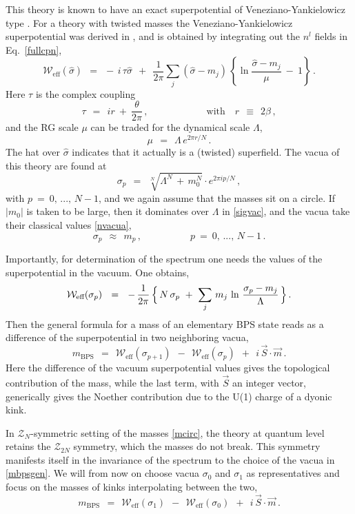 \documentclass[epsfig,12pt]{article}
\def\beq{\begin{equation}}
\def\eeq{\end{equation}}
\def\beq{\begin{equation}}
\def\eeq{\end{equation}}
\newcommand{\mc}[1]{\mathcal{#1}}
\newcommand{\mbps}{m_\text{BPS}}
\newcommand{\W}{\mathcal{W}}
\newcommand{\hsigma}{{\hat{\sigma}}}
\begin{document}
	This theory is known to have an exact superpotential of Veneziano-Yankielowicz type 
	\cite{VYan}.
	For a theory with twisted masses the Veneziano-Yankielowicz superpotential was 
	derived in \cite{AdDVecSal,ChVa,W93,HaHo,Dor}, 
	and is obtained by integrating out the $ n^l $ fields in Eq.~\eqref{fullcpn},
\beq
\label{Wfull}
	\W_\text{eff}(\hsigma) ~~=~~
		-\, i\, \tau \hsigma ~~+~~
		\frac{1}{2\pi} \sum_j (\hsigma - m_j)\, 
				      \left\{ \ln {\frac{\hsigma - m_j}{\mu}} ~-~ 1 \right\}\,.
\eeq
	Here $ \tau $ is the complex coupling
\beq
	\tau ~~=~~ i r ~+~ \frac{\theta}{2\pi}\,, \qquad\qquad\qquad   \text{with~~~} r ~~\equiv~~ 2\beta\,,
\eeq
	and the RG scale $ \mu $ can be traded for the dynamical scale $ \Lambda $,
\beq
	\mu ~~=~~ \Lambda\, e^{2\pi r/N}\,.
\eeq
	The hat over $ \hsigma $ indicates that it actually is a (twisted) superfield.
	The vacua of this theory are found at
\beq
\label{sigvac}
	\sigma_p ~~=~~ \sqrt[N] { \Lambda^N \,+\, m_0^N } \cdot e^{ 2\pi i p / N }\,, 
\eeq
	with $ p ~=~ 0,\,...,\, N-1 $, 
	and we again assume that the masses sit on a circle.
	If $ | m_ 0 | $ is taken to be large, then it dominates over $ \Lambda $ in \eqref{sigvac},
	and the vacua take their classical values \eqref{nvacua},
\beq
	\sigma_p ~~\approx~~ m_p\,, \qquad\qquad\quad p ~=~ 0,\,...,\,N-1\,.
\eeq

	Importantly, for determination of the spectrum one needs the values of the superpotential
	in the vacuum.
	One obtains,
\beq
\label{Wvac}
	\W_\text{eff} ( \sigma_p ) ~~=~~ 
		-\, \frac{1}{2\pi}\,  
                \Bigl\{\, N\, \sigma_p ~+~ \sum_j\, m_j\, \ln \,\frac{\sigma_p - m_j}{\Lambda} \,\Bigr\}\,.
\eeq
	Then the general formula for a mass of an elementary BPS state reads as a difference of the 
	superpotential in two neighboring vacua, 
\beq
\label{mbpsgen}
	\mbps ~~=~~ \W_\text{eff} ( \sigma_{p+1} ) ~~-~~ \W_\text{eff} ( \sigma_p ) ~~+~~ i\, \vec{S} \cdot \vec{m}\,.
\eeq
	Here the difference of the vacuum superpotential values gives the topological contribution of the mass,
	while the last term, with $ \vec{S} $ an integer vector, generically gives the Noether contribution 
	due to the U(1) charge of a dyonic kink.

	In $ \mc{Z}_N $-symmetric setting of the masses \eqref{mcirc}, the theory at quantum level
	retains the $ \mc{Z}_{2N} $ symmetry, which the masses do not break.
	This symmetry manifests itself in the invariance of the spectrum 
	to the choice of the vacua in \eqref{mbpsgen}.
	We will from now on choose vacua $ \sigma_0 $ and $ \sigma_1 $ as representatives
	and focus on the masses of kinks interpolating between the two,
\beq
\label{mbpsmain}
	\mbps ~~=~~  \W_\text{eff} ( \sigma_1 ) ~~-~~ \W_\text{eff} ( \sigma_0 ) ~~+~~ i\, \vec{S} \cdot \vec{m}\,.
\eeq
\end{document}

